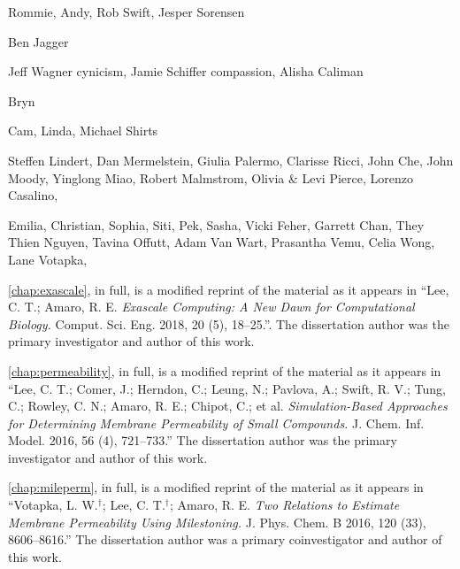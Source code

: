 \begin{frontmatter}
%
\tableofcontents
\listoffigures  %
\listoftables   %



%
%
\begin{acknowledgements}
\par Rommie, Andy, Rob Swift, Jesper Sorensen
\par Ben Jagger
\par Jeff Wagner cynicism, Jamie Schiffer compassion, Alisha Caliman
\par Bryn

\par Cam, Linda, Michael Shirts

\par Steffen Lindert, Dan Mermelstein, Giulia Palermo, Clarisse Ricci, John Che, John Moody, Yinglong Miao, Robert Malmstrom, Olivia \& Levi Pierce, Lorenzo Casalino,

\par Emilia, Christian, Sophia, Siti, Pek, Sasha, Vicki Feher, Garrett Chan, They Thien Nguyen, Tavina Offutt, Adam Van Wart, Prasantha Vemu, Celia Wong, Lane Votapka,

\par \cref{chap:exascale}, in full, is a modified reprint of the material as it appears in ``Lee, C. T.; Amaro, R. E. \emph{Exascale Computing: A New Dawn for Computational Biology.} Comput. Sci. Eng. 2018, 20 (5), 18–25.''.
The dissertation author was the primary investigator and author of this work.

\par \cref{chap:permeability}, in full, is a modified reprint of the material as it appears in ``Lee, C. T.; Comer, J.; Herndon, C.; Leung, N.; Pavlova, A.; Swift, R. V.; Tung, C.; Rowley, C. N.; Amaro, R. E.; Chipot, C.; et al. \emph{Simulation-Based Approaches for Determining Membrane Permeability of Small Compounds.} J. Chem. Inf. Model. 2016, 56 (4), 721–733.''
The dissertation author was the primary investigator and author of this work.

\par \cref{chap:mileperm}, in full, is a modified reprint of the material as it appears in ``Votapka, L. W.$^{\dagger}$; Lee, C. T.$^{\dagger}$; Amaro, R. E. \emph{Two Relations to Estimate Membrane Permeability Using Milestoning.} J. Phys. Chem. B 2016, 120 (33), 8606–8616.''
The dissertation author was a primary coinvestigator and author of this work.


\end{acknowledgements}
\end{frontmatter}
